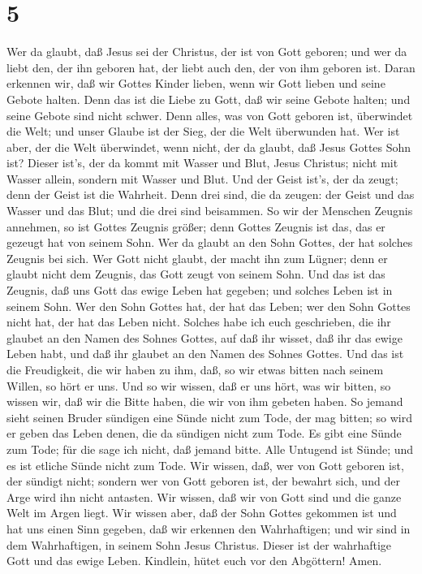 \hypertarget{section-4}{%
\section{5}\label{section-4}}

 Wer da glaubt, daß Jesus sei der Christus, der ist von Gott
geboren; und wer da liebt den, der ihn geboren hat, der liebt auch den,
der von ihm geboren ist.  Daran erkennen wir, daß wir Gottes
Kinder lieben, wenn wir Gott lieben und seine Gebote halten.
 Denn das ist die Liebe zu Gott, daß wir seine Gebote
halten; und seine Gebote sind nicht schwer.  Denn alles, was
von Gott geboren ist, überwindet die Welt; und unser Glaube ist der
Sieg, der die Welt überwunden hat.  Wer ist aber, der die
Welt überwindet, wenn nicht, der da glaubt, daß Jesus Gottes Sohn ist?
 Dieser ist's, der da kommt mit Wasser und Blut, Jesus
Christus; nicht mit Wasser allein, sondern mit Wasser und Blut. Und der
Geist ist's, der da zeugt; denn der Geist ist die Wahrheit. 
Denn drei sind, die da zeugen: der Geist und das Wasser und das Blut;
 und die drei sind beisammen.  So wir der
Menschen Zeugnis annehmen, so ist Gottes Zeugnis größer; denn Gottes
Zeugnis ist das, das er gezeugt hat von seinem Sohn.  Wer
da glaubt an den Sohn Gottes, der hat solches Zeugnis bei sich. Wer Gott
nicht glaubt, der macht ihn zum Lügner; denn er glaubt nicht dem
Zeugnis, das Gott zeugt von seinem Sohn.  Und das ist das
Zeugnis, daß uns Gott das ewige Leben hat gegeben; und solches Leben ist
in seinem Sohn.  Wer den Sohn Gottes hat, der hat das
Leben; wer den Sohn Gottes nicht hat, der hat das Leben nicht.
 Solches habe ich euch geschrieben, die ihr glaubet an den
Namen des Sohnes Gottes, auf daß ihr wisset, daß ihr das ewige Leben
habt, und daß ihr glaubet an den Namen des Sohnes Gottes. 
Und das ist die Freudigkeit, die wir haben zu ihm, daß, so wir etwas
bitten nach seinem Willen, so hört er uns.  Und so wir
wissen, daß er uns hört, was wir bitten, so wissen wir, daß wir die
Bitte haben, die wir von ihm gebeten haben.  So jemand
sieht seinen Bruder sündigen eine Sünde nicht zum Tode, der mag bitten;
so wird er geben das Leben denen, die da sündigen nicht zum Tode. Es
gibt eine Sünde zum Tode; für die sage ich nicht, daß jemand bitte.
 Alle Untugend ist Sünde; und es ist etliche Sünde nicht
zum Tode.  Wir wissen, daß, wer von Gott geboren ist, der
sündigt nicht; sondern wer von Gott geboren ist, der bewahrt sich, und
der Arge wird ihn nicht antasten.  Wir wissen, daß wir von
Gott sind und die ganze Welt im Argen liegt.  Wir wissen
aber, daß der Sohn Gottes gekommen ist und hat uns einen Sinn gegeben,
daß wir erkennen den Wahrhaftigen; und wir sind in dem Wahrhaftigen, in
seinem Sohn Jesus Christus. Dieser ist der wahrhaftige Gott und das
ewige Leben.  Kindlein, hütet euch vor den Abgöttern! Amen.
